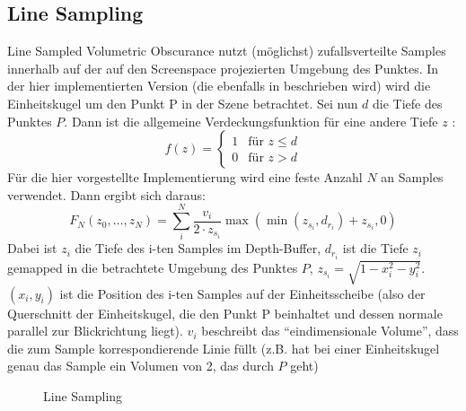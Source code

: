\documentclass[runningheaders,a4paper]{llncs}
\begin{document}
\subsection{Line Sampling}
Line Sampled Volumetric Obscurance nutzt (möglichst) zufallsverteilte Samples innerhalb auf der auf den
Screenspace projezierten Umgebung des Punktes. In der hier implementierten Version (die ebenfalls in
\cite{voPaper} beschrieben wird) wird die Einheitskugel um den Punkt P in der Szene betrachtet.
Sei nun $d$ die Tiefe des Punktes $P$. Dann ist die allgemeine Verdeckungsfunktion für eine andere Tiefe
$z$ :
$$
f(z) = \begin{cases} 1 &  \text{für } z \leq d \\ 0 & \text{für } z > d \end{cases}
$$
Für die hier vorgestellte Implementierung wird eine feste Anzahl $N$ an Samples verwendet.
Dann ergibt sich daraus:
$$
F_{N}(z_0, \dots, z_N) = \sum_i^N \frac{v_i}{2 \cdot z_{s_i}} \max{(\min{(z_{s_i}, d_{r_i})} + z_{s_i}, 0)}
$$
Dabei ist $z_i$ die Tiefe des i-ten Samples im Depth-Buffer, $d_{r_i}$ ist die Tiefe $z_i$ gemapped in die
betrachtete Umgebung des Punktes $P$, $z_{s_i} = \sqrt{1 - x_i^2 - y_i^2}$. $(x_i, y_i)$ ist die Position des
i-ten Samples auf der Einheitsscheibe (also der Querschnitt der Einheitskugel, die den Punkt P 
beinhaltet und dessen normale parallel zur Blickrichtung liegt). $v_i$ beschreibt das ``eindimensionale
Volume'', dass die zum Sample korrespondierende Linie füllt (z.B. hat bei einer Einheitskugel genau das Sample
ein Volumen von 2, das durch $P$ geht) \newline

\begin{figure}
	\centering

	
	\label{ref:lineSample}

	\caption{Line Sampling}
\end{figure}
\end{document}
